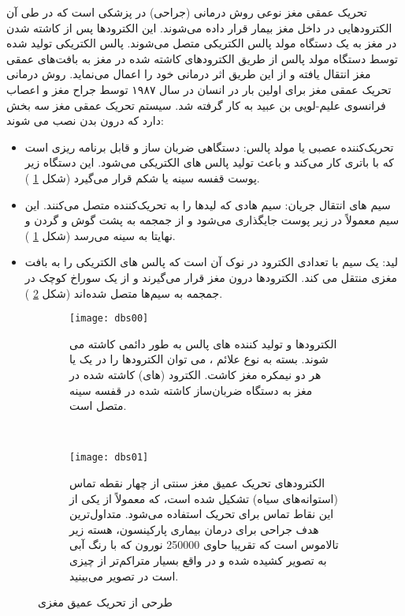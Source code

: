تحریک عمقی مغز نوعی روش درمانی (جراحی) در پزشکی است که در طی آن الکترودهایی در داخل مغز بیمار قرار داده می‌شوند. این الکترودها پس از کاشته شدن در مغز به یک دستگاه مولد پالس الکتریکی
  متصل می‌شوند. پالس الکتریکی تولید شده توسط دستگاه مولد پالس از طریق الکترودهای کاشته شده در مغز به بافت‌های عمقی مغز انتقال یافته و از این طریق اثر درمانی خود را اعمال می‌نماید. روش درمانی تحریک عمقی مغز برای اولین بار در انسان در سال ۱۹۸۷ توسط جراح مغز و اعصاب فرانسوی علیم-لویی بن عبید
به کار گرفته شد. سیستم تحریک عمقی مغز سه بخش دارد که درون بدن نصب می شوند:
\begin{itemize}
\item تحریک‌کننده عصبی یا مولد پالس: دستگاهی ضربان ساز و قابل برنامه ریزی است که با باتری کار می‌کند و باعث تولید پالس های الکتریکی می‌شود. این دستگاه زیر پوست قفسه سینه یا شکم قرار می‌گیرد (شکل 
\ref{fig:dbs00}
).
\item سیم های انتقال جریان: سیم هادی که لیدها را به تحریک‌کننده متصل می‌کنند. این سیم معمولاً در زیر پوست جایگذاری می‌شود و از جمجمه به پشت گوش و گردن و نهایتا به سینه می‌رسد (شکل 
\ref{fig:dbs00}
).
\item لید: یک سیم با تعدادی الکترود در نوک آن است که پالس های الکتریکی را به بافت مغزی منتقل می کند. الکترودها درون مغز قرار می‌گیرند و از یک سوراخ کوچک در جمجمه به سیم‌ها متصل شده‌اند (شکل 
\ref{fig:dbs01}
).
\end{itemize}

\begin{figure}[h!]
    \centering
     \begin{subfigure}[t]{0.45\textwidth}
         \centering
         \texttt{[image: dbs00]}
         \caption{
         الکترودها و تولید کننده های پالس به طور دائمی کاشته می شوند. 
         بسته به نوع علائم ، می توان الکترودها را در یک یا هر دو نیمکره مغز کاشت.
         الکترود (های) کاشته شده در مغز به دستگاه ضربان‌ساز کاشته شده در قفسه سینه متصل است.
         }
         \label{fig:dbs00}
     \end{subfigure}
    \
         \begin{subfigure}[t]{0.45\textwidth}
         \centering
         \texttt{[image: dbs01]}
         \caption{  
         الکترودهای تحریک عمیق مغز سنتی از چهار نقطه تماس (استوانه‌های سیاه) تشکیل شده است، که معمولاً از یکی از این نقاط تماس برای تحریک استفاده می‌شود. متداول‌ترین هدف جراحی برای درمان بیماری پارکینسون‌، هسته زیر تالاموس است که تقریبا حاوی 250000 نورون که با رنگ آبی به تصویر کشیده شده و در واقع بسیار متراکم‌تر از چیزی است در تصویر می‌بینید.
         }
         \label{fig:dbs01}
     \end{subfigure}
     \caption{طرحی از تحریک عمیق مغزی }
    \label{fig:dbs}
\end{figure}


